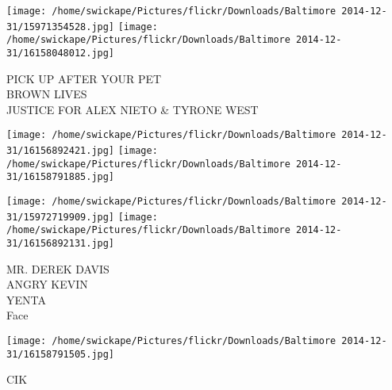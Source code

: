 \documentclass[10pt,letterpaper]{article}
\begin{document}
\vspace{0.25in}
\texttt{[image: /home/swickape/Pictures/flickr/Downloads/Baltimore 2014-12-31/15971354528.jpg]}
\texttt{[image: /home/swickape/Pictures/flickr/Downloads/Baltimore 2014-12-31/16158048012.jpg]}

PICK UP AFTER YOUR PET\\
BROWN LIVES\\
JUSTICE FOR ALEX NIETO \& TYRONE WEST\\
\pagebreak

\texttt{[image: /home/swickape/Pictures/flickr/Downloads/Baltimore 2014-12-31/16156892421.jpg]}
\texttt{[image: /home/swickape/Pictures/flickr/Downloads/Baltimore 2014-12-31/16158791885.jpg]}

\texttt{[image: /home/swickape/Pictures/flickr/Downloads/Baltimore 2014-12-31/15972719909.jpg]}
\texttt{[image: /home/swickape/Pictures/flickr/Downloads/Baltimore 2014-12-31/16156892131.jpg]}

MR. DEREK DAVIS\\
ANGRY KEVIN\\
YENTA\\
Face\\
\pagebreak

\texttt{[image: /home/swickape/Pictures/flickr/Downloads/Baltimore 2014-12-31/16158791505.jpg]}

CIK\\
\pagebreak
\end{document}

